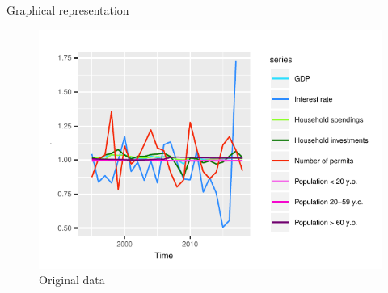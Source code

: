 \documentclass[11pt,ignorenonframetext,]{beamer}
\begin{document}
\begin{frame}{Graphical representation}
\protect\hypertarget{graphical-representation}{}

\FloatBarrier

\tiny

\begin{figure}[!htbp]

{\centering \includegraphics{presentation_files/figure-beamer/unnamed-chunk-12-1} 

}

\caption{Original data}\label{fig:unnamed-chunk-12}
\end{figure}

\normalsize

\FloatBarrier

\end{frame}
\end{document}
